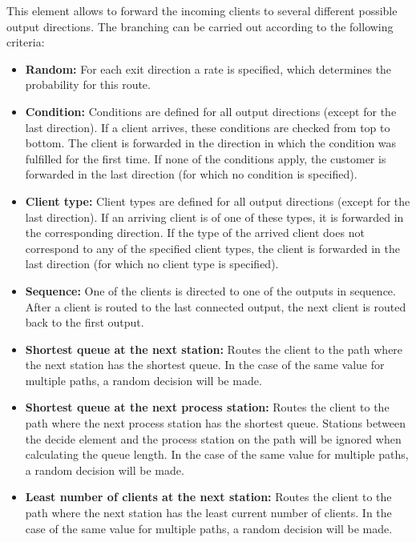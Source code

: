 This element allows to forward the incoming clients to several different possible output directions.
The branching can be carried out according to the following criteria:

\begin{itemize}
  \item 
    \textbf{Random:}
    For each exit direction a rate is specified, which determines the probability for this route.

  \item 
    \textbf{Condition:}
    Conditions are defined for all output directions (except for the last direction).
    If a client arrives, these conditions are checked from top to bottom.
    The client is forwarded in the direction in which the condition was fulfilled for the first time.
    If none of the conditions apply, the customer is forwarded in the last direction
    (for which no condition is specified).

  \item 
    \textbf{Client type:}
    Client types are defined for all output directions (except for the last direction).
    If an arriving client is of one of these types, it is forwarded in the corresponding direction.
    If the type of the arrived client does not correspond to any of the specified client types,
    the client is forwarded in the last direction (for which no client type is specified).

  \item 
    \textbf{Sequence:}
    One of the clients is directed to one of the outputs in sequence. After a client is routed to the last
    connected output, the next client is routed back to the first output.

  \item 
    \textbf{Shortest queue at the next station:}
    Routes the client to the path where the next station
    has the shortest queue. In the case of the same value
    for multiple paths, a random decision will be made.

  \item 
    \textbf{Shortest queue at the next process station:}
    Routes the client to the path where the next process station
    has the shortest queue. Stations between the decide element
    and the process station on the path will be ignored when
    calculating the queue length. In the case of the same value
    for multiple paths, a random decision will be made.

  \item  
    \textbf{Least number of clients at the next station:}
    Routes the client to the path where the next station
    has the least current number of clients. In the case of the same value
    for multiple paths, a random decision will be made.    


\end{itemize}

